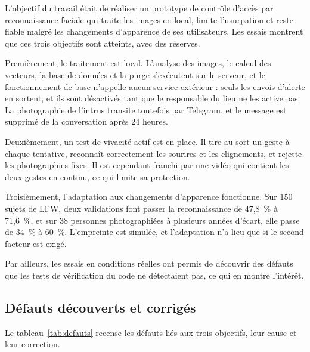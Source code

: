 \begin{maj}
L'objectif du travail était de réaliser un prototype de contrôle d'accès par reconnaissance faciale qui traite les images en local, limite l'usurpation et reste fiable malgré les changements d'apparence de ses utilisateurs. Les essais montrent que ces trois objectifs sont atteints, avec des réserves.

Premièrement, le traitement est local. L'analyse des images, le calcul des vecteurs, la base de données et la purge s'exécutent sur le serveur, et le fonctionnement de base n'appelle aucun service extérieur : seuls les envois d'alerte en sortent, et ils sont désactivés tant que le responsable du lieu ne les active pas. La photographie de l'intrus transite toutefois par Telegram, et le message est supprimé de la conversation après 24 heures.

Deuxièmement, un test de vivacité actif est en place. Il tire au sort un geste à chaque tentative, reconnaît correctement les sourires et les clignements, et rejette les photographies fixes. Il est cependant franchi par une vidéo qui contient les deux gestes en continu, ce qui limite sa protection.

Troisièmement, l'adaptation aux changements d'apparence fonctionne. Sur 150 sujets de LFW, deux validations font passer la reconnaissance de 47,8~\% à 71,6~\%, et sur 38 personnes photographiées à plusieurs années d'écart, elle passe de 34~\% à 60~\%. L'empreinte est simulée, et l'adaptation n'a lieu que si le second facteur est exigé.

Par ailleurs, les essais en conditions réelles ont permis de découvrir des défauts que les tests de vérification du code ne détectaient pas, ce qui en montre l'intérêt.
\end{maj}

\subsection{Défauts découverts et corrigés}

\begin{maj}
Le tableau~\ref{tab:defauts} recense les défauts liés aux trois objectifs, leur cause et leur correction.
\end{maj}

